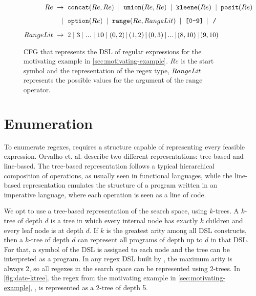 \begin{figure}[t]
  \begin{align*}
    Re \;\to \;\;&  \texttt{concat}(Re, Re) \;\;|\;\;  \texttt{union}(Re, Re)   \;\;|\;\;  \texttt{kleene}(Re) \;\;|\;\;  \texttt{posit}(Re) \\[1.1ex]
          |\;\;&  \texttt{option}(Re) \;\;|\;\;  \texttt{range}(Re, RangeLit) \;\;|\;\; \texttt{[0-9]} \;\;|\;\; \texttt{/}\\[1.3ex]
    RangeLit \;\to \;\;&  2 \;|\; 3 \;|\; ... \;|\; 10 \;|\; (0,2) \,|\, (1,2)\,|\, (0,3) \,|\, ... \,|\, (8,10)\,|\, (9,10)
  \end{align*}
  \captionsetup{belowskip=-7pt, aboveskip=-5pt}
  \caption{\ac{CFG} that represents the \ac{DSL} of regular expressions for the motivating example in \autoref{sec:motivating-example}. \(Re\) is the start symbol and the representation of the regex type, \(RangeLit{}\) represents the possible values for the argument of the range operator.}
  \label{fig:dsl}
\end{figure}



\section{Enumeration}\label{sec:regex-enumeration}

To enumerate regexes, \Forest{} requires a structure capable of representing every feasible expression. %
Orvalho et. al. \cite{Orvalho19} describe two different representations: tree-based and line-based. The tree-based representation follows a typical hierarchical composition of operations, as usually seen in functional languages, while the line-based representation emulates the structure of a program written in an imperative language, where each operation is seen as a line of code.

We opt to use a tree-based representation of the search space, using \(k\)-trees. A \(k\)-tree of depth \(d\) is a tree in which every internal node has exactly \(k\) children and every leaf node is at depth \(d\).
If \(k\) is the greatest arity among all DSL constructs, then a \(k\)-tree of depth \(d\) can represent all programs of depth up to \(d\) in that \ac{DSL}. For that, a symbol of the DSL is assigned to each node and the tree can be interpreted as a program. In any regex DSL built by \Forest{}, the maximum arity is always 2, so all regexes in the search space can be represented using 2-trees. In \autoref{fig:date-ktree}, the regex from the motivating example in \autoref{sec:motivating-example}, , is represented as a 2-tree of depth 5.

